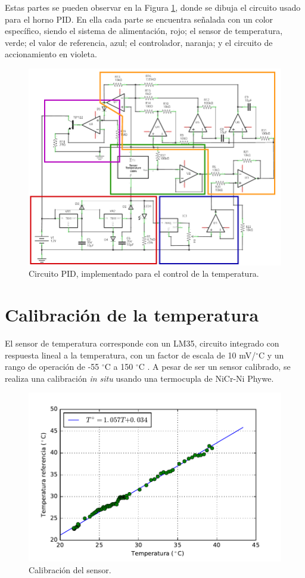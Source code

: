 \documentclass{wileysix}
\begin{document}
Estas partes se pueden observar en la Figura \ref{fig: circuito}, donde se dibuja el circuito usado para el horno PID. En ella cada parte se encuentra se\~nalada con un color espec\'ifico, siendo el sistema de alimentaci\'on, rojo; el sensor de temperatura, verde; el valor de referencia, azul; el controlador, naranja; y el circuito de accionamiento en violeta. 
\begin{figure}[h]
	\centering
	\includegraphics[width=0.9\linewidth]{extras/circuit_schem.pdf}
	\caption{Circuito PID, implementado para el control de la temperatura.}
	\label{fig: circuito}
\end{figure}

\section{Calibraci\'on de la temperatura}
El sensor de temperatura corresponde con un LM35, circuito integrado con respuesta lineal a la temperatura, con un factor de escala de 10 mV/$^\circ$C y un rango de operaci\'on de -55 $^\circ$C a 150 $^\circ$C \cite{LM35}. A pesar de ser un sensor calibrado, se realiza una calibraci\'on \textit{in situ} usando una termocupla de NiCr-Ni Phywe.
\begin{figure}[h]
	\centering
	\includegraphics[width=0.6\linewidth]{extras/temp_cal.pdf}
	\caption{Calibraci\'on del sensor.}
	\label{fig: temp calibration}
\end{figure}
\end{document}
